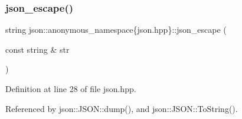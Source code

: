 \subsubsection{\texorpdfstring{json\+\_\+escape()}{json\_escape()}}
{\footnotesize\ttfamily string json\+::anonymous\+\_\+namespace\{json.\+hpp\}\+::json\+\_\+escape (\begin{DoxyParamCaption}\item[{const string \&}]{str }\end{DoxyParamCaption})}



Definition at line 28 of file json.\+hpp.



Referenced by json\+::\+J\+S\+O\+N\+::dump(), and json\+::\+J\+S\+O\+N\+::\+To\+String().


